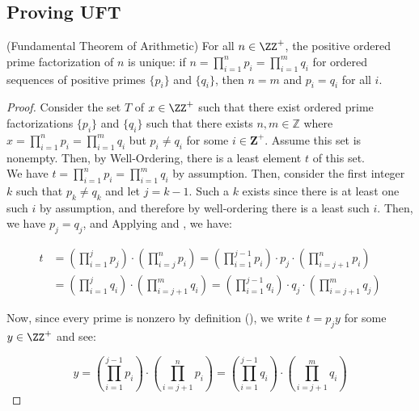 \subsection{Proving UFT}

\begin{theorem}\label{uft}
(Fundamental Theorem of Arithmetic) For all $n \in \ZZ^+$, the positive ordered prime factorization of $n$ is unique: if $n = \prod_{i=1}^{n} p_i = \prod_{i=1}^m q_i$ for ordered sequences of positive primes $\{p_i\}$ and $\{q_i\}$, then $n = m$ and $p_i = q_i$ for all $i$. 
\end{theorem}

\begin{proof}
Consider the set $T$ of $x \in \ZZ^+$ such that there exist ordered prime factorizations $\{ p_i \}$ and $\{ q_i \}$ such that there exists $n, m \in \mathbb{Z} $ where $x = \prod_{i=1}^{n} p_i = \prod_{i=1}^{m} q_i$ but $p_i \neq q_i$ for some $i \in \mathbf{Z}^+$. Assume this set is nonempty. Then, by Well-Ordering, there is a least element $t$ of this set. \\

We have $t = \prod_{i=1}^{n} p_i = \prod_{i=1}^m q_i$ by assumption. Then, consider the first integer $k$ such that $p_k \neq q_k$ and let $j = k-1$. Such a $k$ exists since there is at least one such $i$ by assumption, and therefore by well-ordering there is a least such $i$. Then, we have $p_j = q_j$, and Applying  and , we have:

\begin{align*}
    t &= \left( \prod_{i=1}^{j} p_j \right) \cdot \left( \prod_{i=j}^{n} p_i \right) = \left( \prod_{i=1}^{j-1} p_i \right) \cdot p_j \cdot \left( \prod_{i=j+1}^{n} p_i \right) \\ &= \left( \prod_{i=1}^{j} q_i \right) \cdot \left( \prod_{i=j+1}^{m} q_i \right) = \left( \prod_{i=1}^{j-1} q_i \right) \cdot q_j \cdot \left( \prod_{i=j+1}^{m} q_j \right)
\end{align*}


Now, since every prime is nonzero by definition (), we write $t = p_j y$ for some $y \in \ZZ^+$ and see:

\begin{equation*}
    y = \left( \prod_{i=1}^{j-1} p_i \right)  \cdot \left( \prod_{i=j+1}^{n} p_i \right) = \left( \prod_{i=1}^{j-1} q_i \right) \cdot \left( \prod_{i=j+1}^{m} q_i \right)
\end{equation*}


\end{proof}
